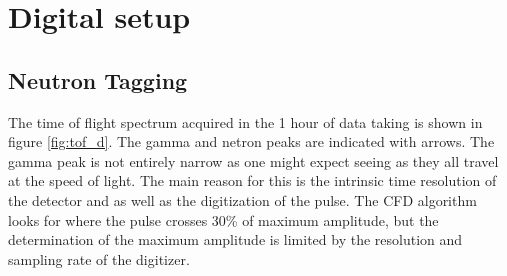 \documentclass[main.tex]{subfiles}
\begin{document}
%
%
%
%
%





\section{Digital setup}

\subsection{Neutron Tagging}
The time of flight spectrum acquired in the 1 hour of data taking is shown in figure \ref{fig:tof_d}. The gamma and netron peaks are indicated with arrows. The gamma peak is not entirely narrow as one might expect seeing as they all travel at the speed of light. The main reason for this is the intrinsic time resolution of the detector and as well as the digitization of the pulse. The CFD algorithm looks for where the pulse crosses 30\% of maximum amplitude, but the determination of the maximum amplitude is limited by the resolution and sampling rate of the digitizer.
\end{document}
